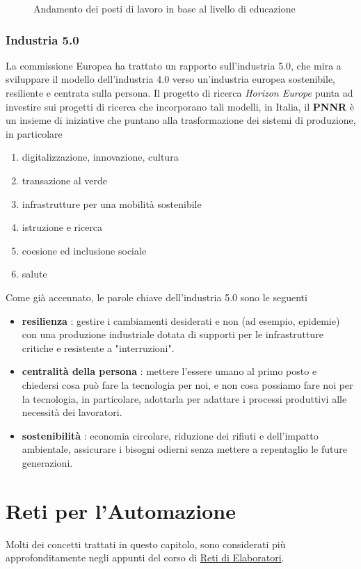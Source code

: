 \documentclass[10pt, letterpaper]{report}
\begin{document}
\begin{figure}[h!]
    \caption{Andamento dei posti di lavoro in base al livello di educazione}
\end{figure}
\subsection{Industria 5.0}
La commissione Europea ha trattato un rapporto sull'industria 5.0, che mira a sviluppare  il modello dell'industria 
4.0 verso un'industria europea sostenibile, resiliente e centrata sulla persona. Il progetto di 
ricerca \textit{Horizon Europe} punta ad investire sui progetti di ricerca che incorporano tali modelli, in Italia, 
il \textbf{PNNR} è un insieme di iniziative che puntano alla trasformazione dei sistemi di produzione, in particolare\begin{enumerate}
    \item digitalizzazione, innovazione, cultura 
    \item transazione al verde 
    \item infrastrutture per una mobilità sostenibile 
    \item istruzione e ricerca 
    \item coesione ed inclusione sociale 
    \item salute
\end{enumerate}
Come già accennato, le parole chiave dell'industria 5.0 sono le seguenti\begin{itemize}
    \item \textbf{resilienza} : gestire i cambiamenti desiderati e non (ad esempio, epidemie) con una 
    produzione  industriale
    dotata di supporti per le
    infrastrutture critiche e
    resistente a "interruzioni".
    \item \textbf{centralità della persona} : mettere l'essere umano al primo posto e chiedersi cosa 
    può fare la tecnologia per noi, e non cosa possiamo fare noi per la tecnologia, in particolare, adottarla 
    per adattare i processi produttivi alle necessità dei lavoratori.
    \item \textbf{sostenibilità} : economia circolare, riduzione dei rifiuti e dell'impatto ambientale, assicurare 
    i bisogni odierni senza mettere
    a repentaglio le future
    generazioni.
\end{itemize}



\chapter{Reti per l'Automazione}
Molti dei concetti trattati in questo capitolo, sono considerati più approfonditamente negli appunti del 
corso di 
\color{blue}\href{https://github.com/CasuFrost/University_notes/blob/main/Secondo%20Anno/Secondo%20Semestre/Reti%20di%20Elaboratori/Latex%20source%20file/Reti%20di%20Elaboratori.pdf}{Reti di Elaboratori}\color{black}.
\end{document}
